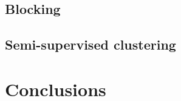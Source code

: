 \documentclass{article}
\begin{document}
\subsection{Blocking}

\subsection{Semi-supervised clustering}



\section{Conclusions}
\label{conclusions}






\end{document}
